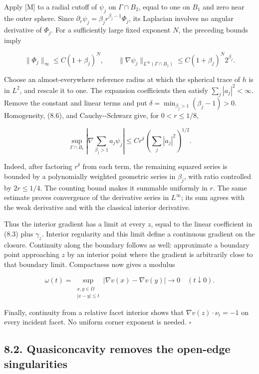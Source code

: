 \documentclass[11pt]{article}
\begin{document}
Apply {[}M{]} to a radial cutoff of \(\psi_j\) on \(\Gamma\cap B_2\),
equal to one on \(B_1\) and zero near the outer sphere. Since
\(\partial_r\psi_j=\beta_jr^{\beta_j-1}\Phi_j\), its Laplacian involves
no angular derivative of \(\Phi_j\). For a sufficiently large fixed
exponent \(N\), the preceding bounds imply

\[
\|\Phi_j\|_\infty\le C(1+\beta_j)^N,
\qquad
\|\nabla\psi_j\|_{L^\infty(\Gamma\cap B_1)}
 \le C(1+\beta_j)^N2^{\beta_j}.
\tag{8.6}
\]

Choose an almost-everywhere reference radius at which the spherical
trace of \(h\) is in \(L^2\), and rescale it to one. The expansion
coefficients then satisfy \(\sum_j|a_j|^2<\infty\). Remove the constant
and linear terms and put \(\delta=\min_{\beta_j>1}(\beta_j-1)>0\).
Homogeneity, (8.6), and Cauchy-\/-Schwarz give, for \(0<r\le1/8\),

\[
\sup_{\Gamma\cap B_r}
 \left|\nabla\sum_{\beta_j>1}a_j\psi_j\right|
 \le C r^\delta
 \left(\sum_j|a_j|^2\right)^{1/2}.
\tag{8.7}
\]

Indeed, after factoring \(r^\delta\) from each term, the remaining
squared series is bounded by a polynomially weighted geometric series in
\(\beta_j\), with ratio controlled by \(2r\le1/4\). The counting bound
makes it summable uniformly in \(r\). The same estimate proves
convergence of the derivative series in \(L^\infty\); its sum agrees
with the weak derivative and with the classical interior derivative.

Thus the interior gradient has a limit at every \(z\), equal to the
linear coefficient in (8.3) plus \(\gamma_z\). Interior regularity and
this limit define a continuous gradient on the closure. Continuity along
the boundary follows as well: approximate a boundary point approaching
\(z\) by an interior point where the gradient is arbitrarily close to
that boundary limit. Compactness now gives a modulus

\[
\omega(t)=\sup_{\substack{x,y\in\overline\Omega\\|x-y|\le t}}
 |\nabla v(x)-\nabla v(y)|\longrightarrow0
 \quad(t\downarrow0).
\tag{8.8}
\]

Finally, continuity from a relative facet interior shows that
\(\nabla v(z)\cdot\nu_i=-1\) on every incident facet. No uniform corner
exponent is needed. \(\square\)

\subsection{8.2. Quasiconcavity removes the open-edge
singularities}\label{quasiconcavity-removes-the-open-edge-singularities}
\end{document}
